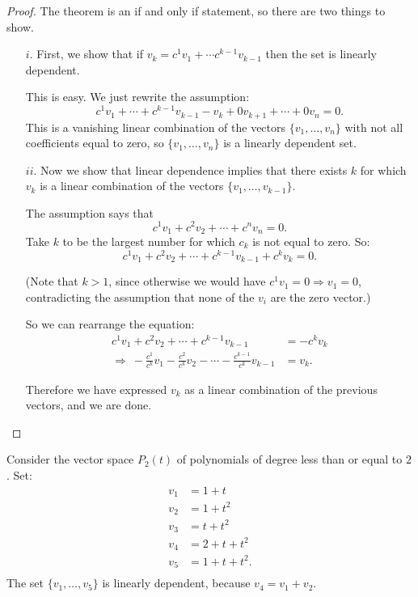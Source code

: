 \begin{proof}
The theorem is an if and only if statement, so there are two things to show.

\begin{itemize}
\item[$i.$]  First, we show that if $v_k=c^1v_1+\cdots c^{k-1}v_{k-1}$ then the set is linearly dependent.

This is easy.  We just rewrite the assumption:
\[
c^1v_1+\cdots+c^{k-1}v_{k-1}-v_k + 0v_{k+1}+\cdots +0v_n=0.
\]
This is a vanishing linear combination of the vectors $\{ v_1, \ldots, v_n \}$ with not all coefficients equal to zero, so $\{ v_1, \ldots, v_n \}$ is a linearly dependent set.
 
\item[$ii.$]  Now we show that linear dependence implies that there exists $k$ for which $v_k$ is a linear combination of the vectors $\{ v_1, \ldots, v_{k-1} \}$.

The assumption says that
\[
c^1v_1 + c^2v_2+ \cdots +c^nv_n=0.
\]
Take $k$ to be the largest number for which $c_k$ is not equal to zero.  So:
\[
c^1v_1 + c^2v_2+ \cdots +c^{k-1}v_{k-1}+c^kv_k=0.
\]

(Note that $k>1$, since otherwise we would have $c^1v_1=0\Rightarrow v_1=0$, contradicting the assumption that none of the $v_i$ are the zero vector.)

So we can rearrange the equation:
\begin{align*}
c^1v_1 + c^2v_2+ \cdots +c^{k-1}v_{k-1}&=-c^kv_k\\
\Rightarrow\ 
-\frac{c^1}{c^k}v_1 - \frac{c^2}{c^k}v_2 - \cdots -\frac{c^{k-1}}{c^k}v_{k-1}&=v_k.
\end{align*}

Therefore we have expressed $v_k$ as a linear combination of the previous vectors, and we are done.
\end{itemize}
\end{proof}


\begin{example}
Consider the vector space $P_2(t)$ of polynomials of degree less than or equal to $2$.  Set:
\begin{align*}
v_1 &= 1+t \\
v_2 &= 1+t^2 \\
v_3 &= t+t^2 \\
v_4 &= 2+t+t^2 \\
v_5 &= 1+t+t^2. \\
\end{align*}
The set $\{ v_1, \ldots, v_5 \}$ is linearly dependent, because $v_4 = v_1+v_2$.  
\end{example}

